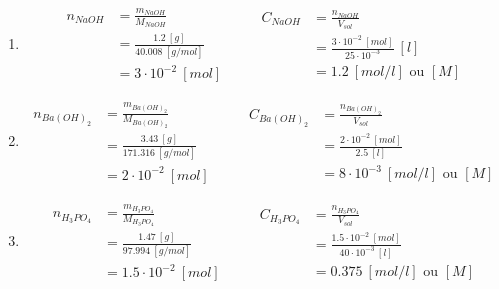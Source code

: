 \documentclass[
  11pt,
  french,
  a4paper,
  openany]{book}
\providecommand{\tightlist}{%
  \setlength{\itemsep}{0pt}\setlength{\parskip}{0pt}}
\begin{document}
\begin{Answer}

\begin{enumerate}
\def\labelenumi{\arabic{enumi}.}
\tightlist
\item
  \[
  \begin{split}
    n_{NaOH} &= \frac{m_{NaOH}}{M_{NaOH}} \\
    &= \frac{1.2\ [g]}{40.008\ [g/mol]} \\
    &= 3 \cdot 10^{-2}\ [mol]
  \end{split}
  \qquad
  \begin{split}
    C_{NaOH} &= \frac{n_{NaOH}}{V_{sol}} \\
    &= \frac{3 \cdot 10^{-2}\ [mol]}{25 \cdot 10^{-3}}\ [l] \\
    &= 1.2\ [mol/l] \text{ ou } [M]
  \end{split}
  \]
\item
  \[
  \begin{split}
    n_{Ba(OH)_2} &= \frac{m_{Ba(OH)_2}}{M_{Ba(OH)_2}} \\
    &= \frac{3.43\ [g]}{171.316\ [g/mol]} \\
    &= 2 \cdot 10^{-2}\ [mol]
  \end{split}
  \qquad
  \begin{split}
    C_{Ba(OH)_2} &= \frac{n_{Ba(OH)_2}}{V_{sol}} \\
    &= \frac{2 \cdot 10^{-2}\ [mol]}{2.5\ [l]} \\
    &= 8 \cdot 10^{-3}\ [mol/l] \text{ ou } [M]
  \end{split}
  \]
\item
  \[
  \begin{split}
    n_{H_3PO_4} &= \frac{m_{H_3PO_4}}{M_{H_3PO_4}} \\
    &= \frac{1.47\ [g]}{97.994\ [g/mol]} \\
    &= 1.5 \cdot 10^{-2}\ [mol]
  \end{split}
  \qquad
  \begin{split}
    C_{H_3PO_4} &= \frac{n_{H_3PO_4}}{V_{sol}} \\
    &= \frac{1.5 \cdot 10^{-2}\ [mol]}{40 \cdot 10^{-3}\ [l]} \\
    &= 0.375\ [mol/l] \text{ ou } [M]
  \end{split}
  \]
\end{enumerate}


\end{Answer}

\newpage
\end{document}
